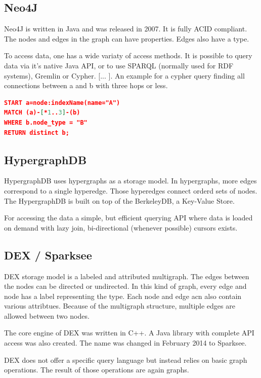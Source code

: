 \documentclass{acm_proc_article-sp}
\begin{document}
\subsection{Neo4J}

Neo4J is written in Java and was released in 2007. It is fully ACID compliant. The nodes and edges in the graph can have properties. Edges also have a type. 

To access data, one has a wide variaty of access methods. It is possible to query data via it's native Java API, or to use SPARQL (normally used for RDF systems), Gremlin or Cypher. [... ]. An example for a cypher query finding all connections between a and b with three hops or less.

\begin{lstlisting}[language=json,firstnumber=1]
START a=node:indexName(name="A")
MATCH (a)-[*1..3]-(b)
WHERE b.node_type = "B"
RETURN distinct b;
\end{lstlisting}

\subsection{HypergraphDB}

HypergraphDB uses hypergraphs as a storage model. In hypergraphs, more edges correspond to a single hyperedge. Those hyperedges connect orderd sets of nodes. The HypergraphDB is built on top of the BerkeleyDB, a Key-Value Store.

For accessing the data a simple, but efficient querying
API where data is loaded on demand with lazy join, bi-directional (whenever
possible) cursors exists.

\subsection{DEX / Sparksee}

DEX storage model is a labeled and attributed multigraph. The edges between the nodes can be directed or undirected. In this kind of graph, every edge and node has a label representing the type. Each node and edge acn also contain various attribtues. Because of the multigraph structure, multiple edges are allowed between two nodes.

The core engine of DEX was written in C++. A Java library with complete API access was also created. The name was changed in February 2014 to Sparksee.

DEX does not offer a specific query language but instead relies on basic graph operations. The result of those operations are again graphs.
\end{document}
